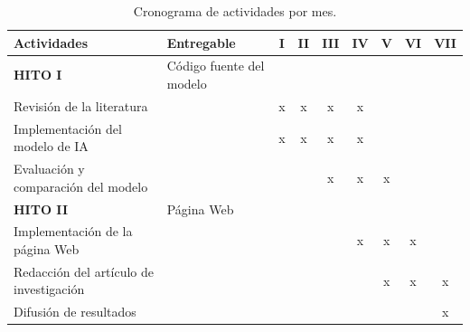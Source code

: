 \documentclass[a4paper]{article}
\begin{document}
\begin{table}[H]
	\centering
	\setlength{\tabcolsep}{0.5em} %
	{\renewcommand{\arraystretch}{1.2}%
		\caption{Cronograma de actividades por mes.}
		\label{tab:actv}
	\begin{tabular}{|p{5.5cm}|p{4cm}|c|c|c|c|c|c|c|} \hline
		\textbf{Actividades}                                  &   \textbf{Entregable}         & I & II & III & IV & V & VI & VII  \\ \hline
		
		\textbf{HITO I} &  Código fuente del modelo & & & & & & & \\
		Revisión de la literatura       &                       & x                     & x                      & x                       & x                      &                       &                        &                                                  \\
		Implementación del modelo de IA  &                           &       x                &           x             &                x         & x                      &                       &                        &                                                \\
		Evaluación y comparación del modelo &    &                       &                        & x                       & x                      & x                     &                        &                                                   \\
		
		\textbf{HITO II} & Página Web & & & & & & & \\
		Implementación de la página Web &  &                     &                        &                         & x                      & x                     & x                      &                                                  \\
		Redacción del artículo de investigación  &                                      &                       &                        &                         &                        & x                     & x                      & x                                              \\
		Difusión de resultados    &                              &                       &                        &                         &                       &                      &                       & x                                             \\ \hline
	\end{tabular}
}
\end{table}
\end{document}

